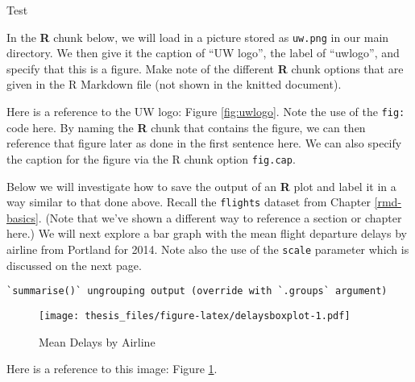 \documentclass[twoside,12pt,final]{ucthesis-CA2012}
\newenvironment{Shaded}{}{}
\newcommand{\KeywordTok}[1]{\textcolor[rgb]{0.00,0.44,0.13}{\textbf{{#1}}}}
\newcommand{\DataTypeTok}[1]{\textcolor[rgb]{0.56,0.13,0.00}{{#1}}}
\newcommand{\StringTok}[1]{\textcolor[rgb]{0.25,0.44,0.63}{{#1}}}
\newcommand{\NormalTok}[1]{{#1}}
\newcommand{\OperatorTok}[1]{\textcolor[rgb]{0.00,0.44,0.13}{\textbf{{#1}}}}
\begin{document}
\begin{ucmainmatter}
Test

In the \textbf{R} chunk below, we will load in a picture stored as \texttt{uw.png} in our main directory. We then give it the caption of ``UW logo'', the label of ``uwlogo'', and specify that this is a figure. Make note of the different \textbf{R} chunk options that are given in the R Markdown file (not shown in the knitted document).

Here is a reference to the UW logo: Figure \ref{fig:uwlogo}. Note the use of the \texttt{fig:} code here. By naming the \textbf{R} chunk that contains the figure, we can then reference that figure later as done in the first sentence here. We can also specify the caption for the figure via the R chunk option \texttt{fig.cap}.

\clearpage

Below we will investigate how to save the output of an \textbf{R} plot and label it in a way similar to that done above. Recall the \texttt{flights} dataset from Chapter \ref{rmd-basics}. (Note that we've shown a different way to reference a section or chapter here.) We will next explore a bar graph with the mean flight departure delays by airline from Portland for 2014. Note also the use of the \texttt{scale} parameter which is discussed on the next page.
\begin{Shaded}
\end{Shaded}
\begin{verbatim}
`summarise()` ungrouping output (override with `.groups` argument)
\end{verbatim}
\begin{figure}
\centering
\texttt{[image: thesis\_files/figure-latex/delaysboxplot-1.pdf]}
\caption{\label{fig:delaysboxplot}Mean Delays by Airline}
\end{figure}
Here is a reference to this image: Figure \ref{fig:delaysboxplot}.


\end{ucmainmatter}
\end{document}
